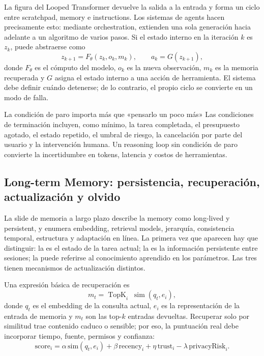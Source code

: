 La figura del Looped Transformer devuelve la salida a la entrada y forma un ciclo entre scratchpad, memory e instructions. Los sistemas de agents hacen precisamente esto: mediante orchestration, extienden una sola generación hacia adelante a un algoritmo de varios pasos. Si el estado interno en la iteración $k$ es $z_k$, puede abstraerse como
\[
z_{k+1}=F_\theta(z_k,o_k,m_k),\qquad
a_k=G(z_{k+1}),
\]
donde $F_\theta$ es el cómputo del modelo, $o_k$ es la nueva observación, $m_k$ es la memoria recuperada y $G$ asigna el estado interno a una acción de herramienta. El sistema debe definir cuándo detenerse; de lo contrario, el propio ciclo se convierte en un modo de falla.


\begin{importantbox}{La condición de paro importa más que «pensarlo un poco más»}
Las condiciones de terminación incluyen, como mínimo, la tarea completada, el presupuesto agotado, el estado repetido, el umbral de riesgo, la cancelación por parte del usuario y la intervención humana. Un reasoning loop sin condición de paro convierte la incertidumbre en tokens, latencia y costos de herramientas.
\end{importantbox}

\subsection{Long-term Memory: persistencia, recuperación, actualización y olvido}

La slide de memoria a largo plazo describe la memory como long-lived y persistent, y enumera embedding, retrieval models, jerarquía, consistencia temporal, estructura y adaptación en línea. La primera vez que aparecen hay que distinguir: la  es el estado de la tarea actual; la  es la información persistente entre sesiones; la  puede referirse al conocimiento aprendido en los parámetros. Las tres tienen mecanismos de actualización distintos.


Una expresión básica de recuperación es
\[
m_t=\operatorname{TopK}_{i}\;\operatorname{sim}(q_t,e_i),
\]
donde $q_t$ es el embedding de la consulta actual, $e_i$ es la representación de la entrada de memoria y $m_t$ son las top-$k$ entradas devueltas. Recuperar solo por similitud trae contenido caduco o sensible; por eso, la puntuación real debe incorporar tiempo, fuente, permisos y confianza:
\[
\text{score}_i=\alpha\,\text{sim}(q_t,e_i)+\beta\,\text{recency}_i+
\eta\,\text{trust}_i-\lambda\,\text{privacyRisk}_i.
\]

